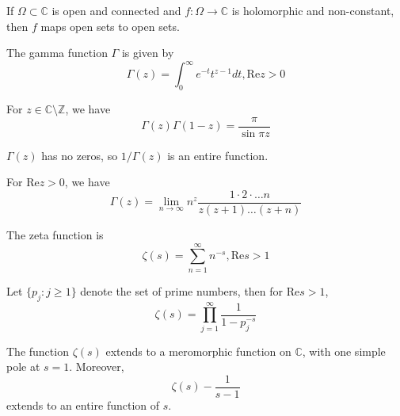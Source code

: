 \documentclass[openany]{book}
\newcommand{\Z}{\mathbb{Z}}
\newcommand{\C}{\mathbb{C}}
\begin{document}
\begin{thm}
    If $\Omega\subset\C$ is open and connected and $f:\Omega\to\C$ is holomorphic and non-constant, then $f$ maps open sets to open sets.
\end{thm}


\begin{defn}
    The gamma function $\Gamma$ is given by 
    \begin{equation*}
        \Gamma(z)=\int_0^\infty e^{-t}t^{z-1}dt, \text{Re}z>0
    \end{equation*}
\end{defn}

\begin{prop}
    For $z\in\C\setminus\Z$, we have 
    \begin{equation*}
        \Gamma(z)\Gamma(1-z)=\frac{\pi}{\sin\pi z}
    \end{equation*}
\end{prop}
\begin{prop}
    $\Gamma(z)$ has no zeros, so $1/\Gamma(z)$ is an entire function.
\end{prop}

\begin{prop}
    For $\text{Re}z>0$, we have 
    \begin{equation*}
        \Gamma(z)=\lim_{n\to\infty}n^z\frac{1\cdot 2\cdot\dots n}{z(z+1)\dots(z+n)}
    \end{equation*}
\end{prop}

\begin{defn}
    The zeta function is 
    \begin{equation*}
        \zeta(s)=\sum_{n=1}^\infty n^{-s}, \text{Re}s>1
    \end{equation*}
\end{defn}

\begin{prop}
    Let $\{p_j:j\geq 1\}$ denote the set of prime numbers, then for $\text{Re}s>1$, 
    \begin{equation*}
        \zeta(s)=\prod_{j=1}^\infty\frac{1}{1-p_j^{-s}}
    \end{equation*}
\end{prop}

\begin{prop}
    The function $\zeta(s)$ extends to a meromorphic function on $\C$, with one simple pole at $s=1$. Moreover, 
    \begin{equation*}
        \zeta(s)-\frac{1}{s-1}
    \end{equation*}
    extends to an entire function of $s$.
\end{prop}
\end{document}
